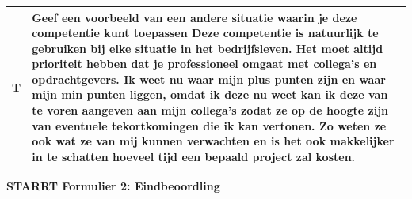 \begin{tabularx}{\textwidth}{| l | X |}
\\
\hline
T & Geef een voorbeeld van een andere situatie waarin je deze competentie kunt toepassen
\newline
\newline
Deze competentie is natuurlijk te gebruiken bij elke situatie in het bedrijfsleven. Het moet altijd prioriteit hebben dat je professioneel omgaat met collega's en opdrachtgevers. Ik weet nu waar mijn plus punten zijn en waar mijn min punten liggen, omdat ik deze nu weet kan ik deze van te voren aangeven aan mijn collega's zodat ze op de hoogte zijn van eventuele tekortkomingen die ik kan vertonen. Zo weten ze ook wat ze van mij kunnen verwachten en is het ook makkelijker in te schatten hoeveel tijd een bepaald project zal kosten.
\\
\hline
\end{tabularx}

\clearpage

\textbf{STARRT Formulier 2: Eindbeoordling}

